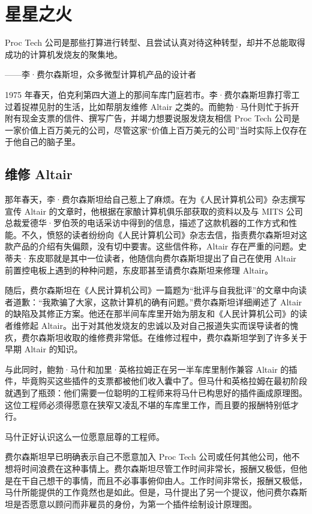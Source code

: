 \documentclass[12pt,UTF8]{ctexbook}
\begin{document}
\section{星星之火}


Proc Tech 公司是那些打算进行转型、且尝试认真对待这种转型，却并不总能取得成功的计算机发烧友的聚集地。

——李·费尔森斯坦，众多微型计算机产品的设计者



1975 年春天，伯克利第四大道上的那间车库门庭若市。李·费尔森斯坦靠打零工过着捉襟见肘的生活，比如帮朋友维修 Altair 之类的。而鲍勃·马什则忙于拆开附有现金支票的信件、撰写广告，并竭力想要说服发烧友相信 Proc Tech 公司是一家价值上百万美元的公司，尽管这家“价值上百万美元的公司”当时实际上仅存在于他自己的脑子里。





\subsection{维修 Altair}


那年春天，李·费尔森斯坦给自己惹上了麻烦。在为《人民计算机公司》杂志撰写宣传 Altair 的文章时，他根据在家酿计算机俱乐部获取的资料以及与 MITS 公司总裁爱德华·罗伯茨的电话采访中得到的信息，描述了这款机器的工作方式和性能。不久，愤怒的读者纷纷向《人民计算机公司》杂志去信，指责费尔森斯坦对这款产品的介绍有失偏颇，没有切中要害。这些信件称，Altair 存在严重的问题。史蒂夫·东皮耶就是其中一位读者，他随信向费尔森斯坦提出了自己在使用 Altair 前置控电板上遇到的种种问题，东皮耶甚至请费尔森斯坦来修理 Altair。

随后，费尔森斯坦在《人民计算机公司》一篇题为“批评与自我批评”的文章中向读者道歉：“我欺骗了大家，这款计算机的确有问题。”费尔森斯坦详细阐述了 Altair 的缺陷及其修正方案。他还在那半间车库里开始为朋友和《人民计算机公司》的读者维修起 Altair。出于对其他发烧友的忠诚以及对自己报道失实而误导读者的愧疚，费尔森斯坦收取的维修费非常低。在维修过程中，费尔森斯坦学到了许多关于早期 Altair 的知识。

与此同时，鲍勃·马什和加里·英格拉姆正在另一半车库里制作兼容 Altair 的插件，毕竟购买这些插件的支票都被他们收入囊中了。但马什和英格拉姆在最初阶段就遇到了瓶颈：他们需要一位聪明的工程师来将马什已构思好的插件画成原理图。这位工程师必须得愿意在狭窄又凌乱不堪的车库里工作，而且要的报酬特别低才行。

马什正好认识这么一位愿意屈尊的工程师。

费尔森斯坦早已明确表示自己不愿意加入 Proc Tech 公司或任何其他公司，他不想将时间浪费在这种事情上。费尔森斯坦尽管工作时间非常长，报酬又极低，但他是在干自己想干的事情，而且不必事事俯仰由人。工作时间非常长，报酬又极低，马什所能提供的工作竟然也是如此。但是，马什提出了另一个提议，他问费尔森斯坦是否愿意以顾问而非雇员的身份，为第一个插件绘制设计原理图。
\end{document}

